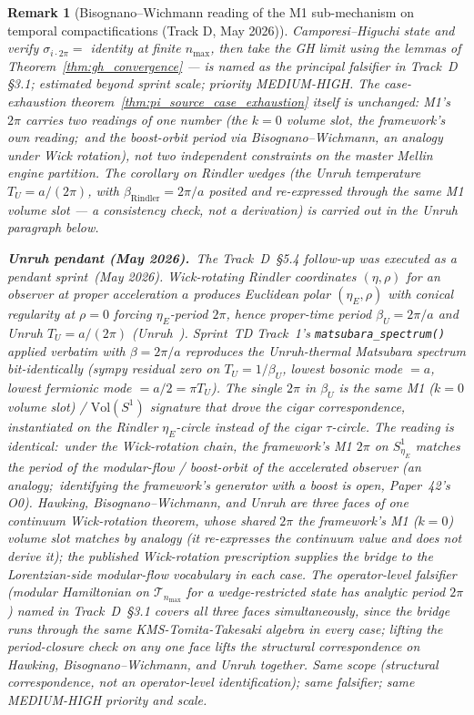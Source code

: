 \documentclass[11pt]{article}
\newtheorem{remark}{Remark}
\begin{document}
\begin{remark}[Bisognano--Wichmann reading of the M1 sub-mechanism on
temporal compactifications (Track D, May 2026)]
Camporesi--Higuchi state and verify $\sigma_{i\cdot 2\pi} = $ identity
at finite $n_{\max}$, then take the GH limit using the lemmas of
Theorem~\ref{thm:gh_convergence} --- is named as the principal falsifier
in Track~D \S 3.1; estimated beyond sprint scale; priority MEDIUM-HIGH.
The case-exhaustion theorem~\ref{thm:pi_source_case_exhaustion} itself
is unchanged: M1's $2\pi$ carries \emph{two readings of one number}
(the $k = 0$ volume slot, the framework's own reading;\ and the
boost-orbit period via Bisognano--Wichmann, an analogy under Wick
rotation), not two independent constraints on the
master Mellin engine partition.
The corollary on Rindler wedges (the Unruh temperature
$T_U = a/(2\pi)$, with $\beta_{\mathrm{Rindler}} = 2\pi/a$ posited and
re-expressed through the same M1 volume slot --- a consistency check,
not a derivation) is carried out in the Unruh paragraph below.

\textbf{Unruh pendant (May 2026).}\ The Track~D~\S 5.4 follow-up was
executed as a pendant
sprint~(May 2026).  Wick-rotating
Rindler coordinates $(\eta, \rho)$ for an observer at proper acceleration
$a$ produces Euclidean polar $(\eta_E, \rho)$ with conical regularity at
$\rho = 0$ forcing $\eta_E$-period $2\pi$, hence proper-time period
$\beta_U = 2\pi / a$ and Unruh $T_U = a/(2\pi)$
(Unruh~\cite{unruh1976}).  Sprint~TD Track~1's
\verb|matsubara_spectrum()| applied verbatim with $\beta = 2\pi/a$
reproduces the Unruh-thermal Matsubara spectrum bit-identically (sympy
residual zero on $T_U = 1/\beta_U$, lowest bosonic mode $= a$, lowest
fermionic mode $= a/2 = \pi T_U$).  The single $2\pi$ in $\beta_U$ is
the same M1 ($k = 0$ volume slot) / $\mathrm{Vol}(S^1)$ signature that drove
the cigar correspondence, instantiated on the Rindler $\eta_E$-circle
instead of the cigar $\tau$-circle.  The reading is identical:\
under the Wick-rotation chain, the framework's M1 $2\pi$ on
$S^1_{\eta_E}$ matches the period of the modular-flow / boost-orbit of the
accelerated observer (an analogy;\ identifying the framework's generator
with a boost is open, Paper~42's O0).  Hawking, Bisognano--Wichmann, and Unruh are
three faces of one continuum Wick-rotation theorem, whose shared $2\pi$
the framework's M1 ($k = 0$) volume slot matches by analogy (it
re-expresses the continuum value and does not derive it);
the published Wick-rotation prescription supplies the bridge to the
Lorentzian-side modular-flow vocabulary in each case.  The
\emph{operator-level falsifier} (modular Hamiltonian on
$\mathcal{T}_{n_{\max}}$ for a wedge-restricted state has analytic
period $2\pi$) named in Track~D~\S 3.1 covers all three faces
simultaneously, since the bridge runs through the same KMS-Tomita-Takesaki
algebra in every case; lifting the period-closure check on any one face
lifts the structural correspondence on Hawking, Bisognano--Wichmann, and
Unruh together.  Same scope (structural correspondence, not an operator-level
identification); same falsifier; same MEDIUM-HIGH priority and scale.


\end{remark}
\end{document}
